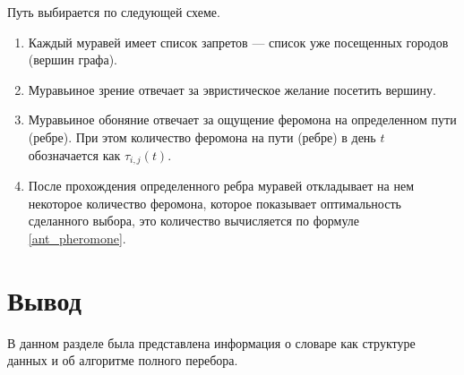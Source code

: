 Путь выбирается по следующей схеме.
\begin{enumerate}[label=\arabic*)]
	\item Каждый муравей имеет список запретов --- список уже посещенных городов (вершин графа).
	\item Муравьиное зрение отвечает за эвристическое желание посетить вершину.
	\item Муравьиное обоняние отвечает за ощущение феромона на определенном пути (ребре). При этом количество феромона на пути (ребре) в день $t$ обозначается как $\tau_{i, j} (t)$.
	\item После прохождения определенного ребра муравей откладывает на нем некоторое количество феромона, которое показывает оптимальность сделанного выбора, это количество вычисляется по формуле \eqref{ant_pheromone}.
\end{enumerate}

\section*{Вывод}
В данном разделе была представлена информация о словаре как структуре данных и об алгоритме полного перебора.